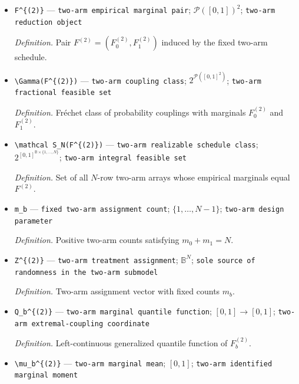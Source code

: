 \documentclass{article}
\begin{document}
\begin{itemize}
  \par\smallskip\noindent\emph{Definition.} Empirical marginal \(F_b^{(2)}=N^{-1}\sum_{i=1}^N\delta_{x^{(2)}_{bi}}\).
  \item \texttt{F\textasciicircum{}\{(2)\}\allowbreak{}} --- \texttt{two-\allowbreak{}arm empirical marginal pair}; \(\mathcal P([0,1])^2\); \texttt{two-\allowbreak{}arm reduction object}
  \par\smallskip\noindent\emph{Definition.} Pair \(F^{(2)}=(F_0^{(2)},F_1^{(2)})\) induced by the fixed two-arm schedule.
  \item \texttt{\textbackslash{}\allowbreak{}Gamma(F\textasciicircum{}\{(2)\}\allowbreak{})} --- \texttt{two-\allowbreak{}arm coupling class}; \(2^{\mathcal P([0,1]^2)}\); \texttt{two-\allowbreak{}arm fractional feasible set}
  \par\smallskip\noindent\emph{Definition.} Fr\'{e}chet class of probability couplings with marginals \(F_0^{(2)}\) and \(F_1^{(2)}\).
  \item \texttt{\textbackslash{}\allowbreak{}mathcal S\_\allowbreak{}N(F\textasciicircum{}\{(2)\}\allowbreak{})} --- \texttt{two-\allowbreak{}arm realizable schedule class}; \(2^{[0,1]^{\mathbb B\times\{1,\ldots,N\}}}\); \texttt{two-\allowbreak{}arm integral feasible set}
  \par\smallskip\noindent\emph{Definition.} Set of all \(N\)-row two-arm arrays whose empirical marginals equal \(F^{(2)}\).
  \item \texttt{m\_\allowbreak{}b} --- \texttt{fixed two-\allowbreak{}arm assignment count}; \(\{1,\ldots,N-1\}\); \texttt{two-\allowbreak{}arm design parameter}
  \par\smallskip\noindent\emph{Definition.} Positive two-arm counts satisfying \(m_0+m_1=N\).
  \item \texttt{Z\textasciicircum{}\{(2)\}\allowbreak{}} --- \texttt{two-\allowbreak{}arm treatment assignment}; \(\mathbb B^N\); \texttt{sole source of randomness in the two-\allowbreak{}arm submodel}
  \par\smallskip\noindent\emph{Definition.} Two-arm assignment vector with fixed counts \(m_b\).
  \item \texttt{Q\_\allowbreak{}b\textasciicircum{}\{(2)\}\allowbreak{}} --- \texttt{two-\allowbreak{}arm marginal quantile function}; \([0,1]\to[0,1]\); \texttt{two-\allowbreak{}arm extremal-\allowbreak{}coupling coordinate}
  \par\smallskip\noindent\emph{Definition.} Left-continuous generalized quantile function of \(F_b^{(2)}\).
  \item \texttt{\textbackslash{}\allowbreak{}mu\_\allowbreak{}b\textasciicircum{}\{(2)\}\allowbreak{}} --- \texttt{two-\allowbreak{}arm marginal mean}; \([0,1]\); \texttt{two-\allowbreak{}arm identified marginal moment}

\end{itemize}
\end{document}
